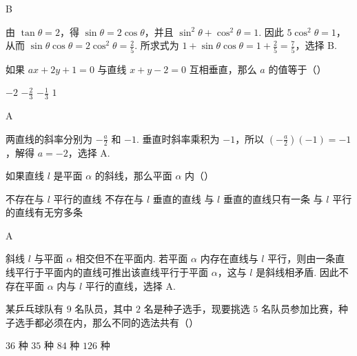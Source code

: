 \begin{answer}
B
\end{answer}

\begin{solution}
由 \(\tan\theta=2\)，得 \(\sin\theta=2\cos\theta\)，并且 \(\sin^2\theta+\cos^2\theta=1\). 因此 \(5\cos^2\theta=1\)，从而 \(\sin\theta\cos\theta=2\cos^2\theta=\frac25\). 所求式为 \(1+\sin\theta\cos\theta=1+\frac25=\frac75\)，选择 B.
\end{solution}

\begin{problem}
如果 \(ax+2y+1=0\) 与直线 \(x+y-2=0\) 互相垂直，那么 \(a\) 的值等于（\quad）

\choices
    {\(-2\)}
    {\(-\frac{2}{3}\)}
    {\(-\frac{1}{3}\)}
    {\(1\)}
\end{problem}

\begin{answer}
A
\end{answer}

\begin{solution}
两直线的斜率分别为 \(-\frac{a}{2}\) 和 \(-1\). 垂直时斜率乘积为 \(-1\)，所以 \(\left(-\frac{a}{2}\right)(-1)=-1\)，解得 \(a=-2\)，选择 A.
\end{solution}

\begin{problem}
如果直线 \(l\) 是平面 \(\alpha\) 的斜线，那么平面 \(\alpha\) 内（\quad）

\choices
    {不存在与 \(l\) 平行的直线}
    {不存在与 \(l\) 垂直的直线}
    {与 \(l\) 垂直的直线只有一条}
    {与 \(l\) 平行的直线有无穷多条}
\end{problem}

\begin{answer}
A
\end{answer}

\begin{solution}
斜线 \(l\) 与平面 \(\alpha\) 相交但不在平面内. 若平面 \(\alpha\) 内存在直线与 \(l\) 平行，则由一条直线平行于平面内的直线可推出该直线平行于平面 \(\alpha\)，这与 \(l\) 是斜线相矛盾. 因此不存在平面 \(\alpha\) 内与 \(l\) 平行的直线，选择 A.
\end{solution}

\begin{problem}
某乒乓球队有 \(9\) 名队员，其中 \(2\) 名是种子选手，现要挑选 \(5\) 名队员参加比赛，种子选手都必须在内，那么不同的选法共有（\quad）

\choices
    {\(36\) 种}
    {\(35\) 种}
    {\(84\) 种}
    {\(126\) 种}
\end{problem}

